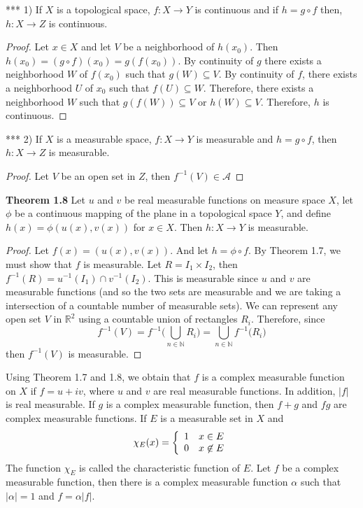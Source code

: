 \documentclass[12pt]{article}
\begin{document}
\noindent **** 1) If $X$ is a topological space, $f: X\rightarrow Y$ is continuous and if $h=g \circ f$ then, $h:X \rightarrow Z$ is continuous. \\
\begin{proof}
Let $x \in X$ and let $V$ be a neighborhood of $h(x_0)$. Then $h(x_0)=(g \circ f)(x_0)=g(f(x_0))$. By continuity of $g$ there exists a neighborhood $W$ of $f(x_0)$ such that $g(W) \subseteq V$. By continuity of $f$, there exists a neighborhood $U$ of $x_0$ such that $f(U) \subseteq W$. Therefore, there exists a neighborhood $W$ such that $g(f(W))\subseteq V$ or $h(W)\subseteq V$. Therefore, $h$ is continuous.   
\end{proof}

\noindent **** 2) If $X$ is a measurable space, $f:X\rightarrow Y$ is measurable and $h=g \circ f$, then $h: X \rightarrow Z$ is measurable. 
\begin{proof}
Let $V$ be an open set in $Z$, then $f^{-1}(V) \in \mathcal{A}$
\end{proof}

\noindent \textbf{Theorem 1.8} Let $u$ and $v$ be real measurable functions on measure space $X$, let $\phi$ be a continuous mapping of the plane in a topological space $Y$, and define $h(x)=\phi(u(x),v(x))$ for $x \in X$. Then $h: X \rightarrow Y$ is measurable. 

\begin{proof}
Let $f(x)=(u(x),v(x))$. And let $h=\phi \circ f$. By Theorem 1.7, we must show that $f$ is measurable. Let $R=I_1 \times I_2$, then $f^{-1}(R)=u^{-1}(I_1) \cap v^{-1}(I_2)$. This is measurable since $u$ and $v$ are measurable functions (and so the two sets are measurable and we are taking a intersection of a countable number of measurable sets). We can represent any open set $V$ in $\mathbb{R}^2$ using  a countable union of rectangles $R_i$.  Therefore, since
$$f^{-1}(V) = f^{-1}\Big(\bigcup_{n \in \mathbb{N}} R_i \Big) = \bigcup_{n \in \mathbb{N}} f^{-1}\Big( R_i \Big) $$
then $f^{-1}(V)$ is measurable. 
\end{proof}

\noindent Using Theorem 1.7 and 1.8, we obtain that $f$ is a complex measurable function on $X$ if $f=u+iv$, where $u$ and $v$ are real measurable functions. In addition, $\vert f \vert$ is real measurable. If $g$ is a complex measurable function, then $f+g$ and $fg$ are complex measurable functions. If $E$ is a measurable set in $X$ and 
$$\chi_E(x) = \left\{ \begin{array}{l l} 1 & x\in E \\ 0 & x \not \in E \end{array} \right.$$
The function $\chi_E$ is called the characteristic function of $E$. Let $f$ be a complex measurable function, then there is a complex measurable function $\alpha$ such that  $\vert \alpha \vert = 1$ and $f = \alpha \vert f \vert$.  \\
\end{document}
